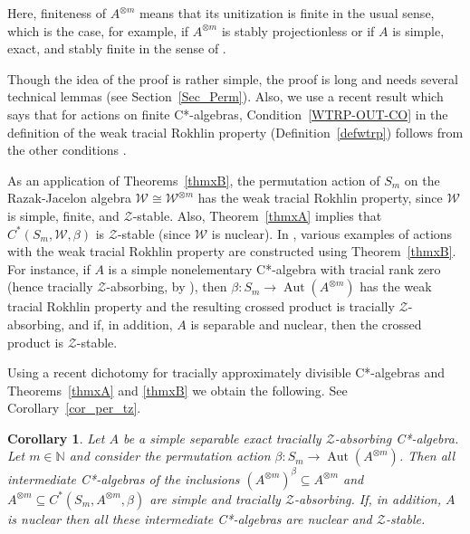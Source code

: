 \documentclass[11pt]{amsart}
\theoremstyle{plain}
\newtheorem{corx}[thmx]{Corollary}
\theoremstyle{definition}
\theoremstyle{remark}
\numberwithin{equation}{section}
\newcommand{\bt}{\beta}
\newcommand{\Aut}{{\operatorname{Aut}}}
\begin{document}
Here, finiteness of $A^{\otimes m}$ means that its unitization
is finite in the usual sense, which is the case,
for example, if $A^{\otimes m}$ is stably projectionless
or if $A$ is simple, exact, and stably finite
in the sense of \cite{Ro02}.

Though the idea of the proof is rather simple,
the proof is  long and needs several technical lemmas
(see  Section~\ref{Sec_Perm}).
Also, we use a recent result  which says
that for actions on finite C*-algebras, Condition~\eqref{WTRP-OUT-CO}
in the definition of the weak tracial Rokhlin property
(Definition~\ref{defwtrp}) follows from 
the other conditions \cite[Proposition~7.12]{AGJP21}.

 \medskip

As an application of Theorems~\ref{thmxB}, the permutation
action of $S_m$ on the Razak-Jacelon algebra 
$\mathcal{W}\cong \mathcal{W}^{\otimes m}$ has the 
weak tracial Rokhlin property, since $\mathcal{W}$ is simple, finite, and 
$\mathcal{Z}$-stable. Also, Theorem~\ref{thmxA} implies that
$C^*(S_m, \mathcal{W}, \beta)$ is $\mathcal{Z}$-stable (since 
$\mathcal{W}$  is nuclear). In \cite[Example~3.12]{FG17}, 
various examples of actions
with the weak tracial Rokhlin property are constructed 
using Theorem~\ref{thmxB}.
For instance, if $A$ is a simple nonelementary C*-algebra with
tracial rank zero
(hence  tracially $\mathcal{Z}$-absorbing, by \cite[Theorem~A]{AGJP21}), 
then $\bt \colon S_m \to \Aut (A^{\otimes m})$
has the weak tracial Rokhlin property and the resulting
crossed product is  tracially $\mathcal{Z}$-absorbing, and if, in addition,
$A$ is separable and nuclear, then the crossed product is   $\mathcal{Z}$-stable.

\medskip
Using a recent dichotomy for tracially approximately divisible C*-algebras \cite{FLL21}
and Theorems~\ref{thmxA} and \ref{thmxB} we obtain the following.
See Corollary~\ref{cor_per_tz}.

\begin{corx}\label{corxC}
Let $A$ be a simple separable exact tracially $\mathcal{Z}$-absorbing
C*-algebra. Let $m\in\mathbb{N}$ and consider
 the permutation action $\bt \colon S_m \to \Aut (A^{\otimes m})$.
 Then  all intermediate C*-algebras of the inclusions
$(A^{\otimes m})^\beta \subseteq A^{\otimes m}$ and 
$A^{\otimes m} \subseteq C^*(S_m, A^{\otimes m},\beta)$
are simple and tracially $\mathcal{Z}$-absorbing. 
If, in addition, $A$ is nuclear then 
all these intermediate C*-algebras 
 are   nuclear and $\mathcal{Z}$-stable.
\end{corx}
\end{document}

